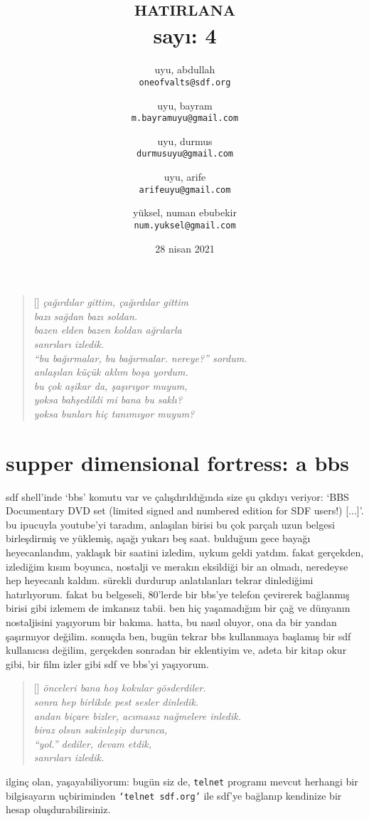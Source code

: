 \documentclass[a4paper, twocolumn]{memoir}
\author{
  uyu, abdullah\\
  \texttt{oneofvalts@sdf.org}
  \and
  uyu, bayram\\
  \texttt{m.bayramuyu@gmail.com}
  \and
  uyu, durmus\\
  \texttt{durmusuyu@gmail.com}
  \and
  uyu, arife\\
  \texttt{arifeuyu@gmail.com}
  \and
  yüksel, numan ebubekir\\
  \texttt{num.yuksel@gmail.com}
}
\title{\textsc{hatirlana}\\\small sayı: 4}
\date{28 nisan 2021}
\begin{document}
\maketitle
\begin{verse}[\versewidth]
\itshape{}
çağırdılar gittim, çağırdılar gittim\\
bazı sağdan bazı soldan.\\
bazen elden bazen koldan ağrılarla\\
sanrıları izledik.\\
``bu bağırmalar, bu bağırmalar. nereye?'' sordum.\\
anlaşılan küçük aklım boşa yordum.\\
bu çok aşikar da, şaşırıyor muyum,\\
yoksa bahşedildi mi bana bu saklı?\\
yoksa bunları hiç tanımıyor muyum?\\
\end{verse}
\section{supper dimensional fortress: a bbs}
sdf shell'inde {\ttfamily `bbs'} komutu var ve çalışdırıldığında size şu
çıkdıyı veriyor: {\ttfamily `BBS  Documentary   DVD  set  (limited signed
and  numbered edition  for SDF users!) [...]'}. bu ipucuyla youtube'yi
taradım, anlaşılan birisi bu çok parçalı uzun belgesi birleşdirmiş ve
yüklemiş, aşağı yukarı beş saat. bulduğum gece bayağı heyecanlandım,
yaklaşık bir saatini izledim, uykum geldi yatdım. fakat gerçekden,
izlediğim kısım boyunca, nostalji ve merakın eksildiği bir an olmadı,
neredeyse hep heyecanlı kaldım. sürekli durdurup anlatılanları tekrar
dinlediğimi hatırlıyorum. fakat bu belgeseli, 80'lerde bir bbs'ye telefon
çevirerek bağlanmış birisi gibi izlemem de imkansız tabii. ben hiç
yaşamadığım bir çağ ve dünyanın nostaljisini yaşıyorum bir bakıma.
hatta, bu nasıl oluyor, ona da bir yandan şaşırmıyor değilim. sonuçda
ben, bugün tekrar bbs kullanmaya başlamış bir sdf kullanıcısı değilim,
gerçekden sonradan bir eklentiyim ve, adeta bir kitap okur gibi, bir film
izler gibi sdf ve bbs'yi yaşıyorum.
\begin{verse}[\versewidth]
\itshape{}
önceleri bana hoş kokular gösderdiler.\\
sonra hep birlikde pest sesler dinledik.\\
andan biçare bizler, acımasız nağmelere inledik.\\
biraz olsun sakinleşip durunca,\\
``yol.'' dediler, devam etdik,\\
sanrıları izledik.\\
\end{verse}
ilginç olan, yaşayabiliyorum: bugün
siz de, \texttt{telnet} programı mevcut herhangi bir bilgisayarın
uçbiriminden \texttt{`telnet sdf.org'} ile sdf'ye bağlanıp kendinize bir
hesap oluşdurabilirsiniz.
\end{document}
